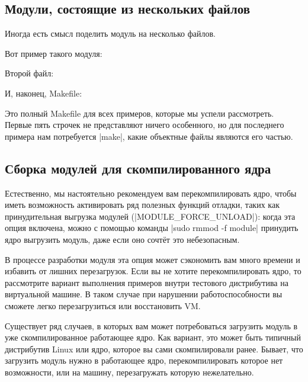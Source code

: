 \documentclass[10pt, oneside]{book}
\begin{document}
\subsection{Модули, состоящие из нескольких файлов}
\label{modfiles}
Иногда есть смысл поделить модуль на несколько файлов.

Вот пример такого модуля:

Второй файл:

И, наконец, Makefile:


Это полный Makefile для всех примеров, которые мы успели рассмотреть. Первые пять строчек не представляют ничего особенного, но для последнего примера нам потребуется \sh|make|, какие объектные файлы являются его частью.

\subsection{Сборка модулей для скомпилированного ядра}
\label{precompiled}
Естественно, мы настоятельно рекомендуем вам перекомпилировать ядро, чтобы иметь возможность активировать ряд полезных функций отладки, таких как принудительная выгрузка модулей (\cpp|MODULE_FORCE_UNLOAD|): когда эта опция включена, можно с помощью команды \sh|sudo rmmod -f module| принудить ядро выгрузить модуль, даже если оно сочтёт это небезопасным.

В процессе разработки модуля эта опция может сэкономить вам много времени и избавить от лишних перезагрузок. Если вы не хотите перекомпилировать ядро, то
рассмотрите вариант выполнения примеров внутри тестового дистрибутива на виртуальной машине. В таком случае при нарушении работоспособности вы сможете
легко перезагрузиться или восстановить VM.

Существует ряд случаев, в которых вам может потребоваться загрузить модуль в уже скомпилированное работающее ядро. Как вариант, это может быть типичный дистрибутив Linux или ядро, которое вы сами скомпилировали ранее. Бывает, что загрузить модуль нужно в работающее ядро, перекомпилировать которое нет возможности, или на машину, перезагружать которую нежелательно.
\end{document}
